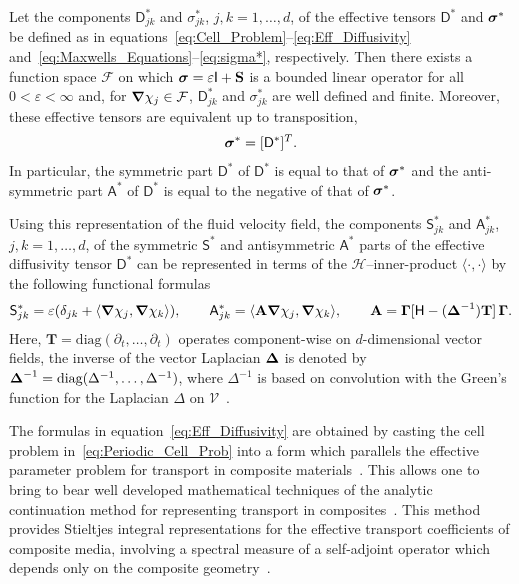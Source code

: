 \documentclass[leqno,onefignum,onetabnum]{siamltex1213}
\newcommand{\Tb}{\mathbf{T}}
\newcommand{\Sb}{\mathbf{S}}
\newcommand{\Ab}{\mathbf{A}}
\newcommand{\bI}{\mathbf{I}}
\newcommand{\Vc}{\mathcal{V}}
\newcommand{\Hc}{\mathcal{H}}
\newcommand{\Fc}{\mathcal{F}}
\newcommand{\Dm}{\mathsf{D}}
\newcommand{\Hm}{\mathsf{H}}
\newcommand{\Sm}{\mathsf{S}}
\newcommand{\Am}{\mathsf{A}}
\newcommand{\Ib}{\mathsf{I}}
\newcommand\bsig{\mbox{\boldmath${\sigma}$}}
\newcommand\bDelta{\mbox{\boldmath${\Delta}$}}
\newcommand\bGamma{\mbox{\boldmath${\Gamma}$}}
\newcommand\bnabla{\mbox{\boldmath${\nabla}$}}
\begin{document}
%
\begin{theorem}\label{thm:kappa_sigma}
%
Let the components $\Dm^*_{jk}$ and $\sigma^*_{jk}$, $j,k=1,\ldots,d$, of the
effective tensors $\Dm^*$ and $\bsig^*$ be defined as in
equations~\eqref{eq:Cell_Problem}--\eqref{eq:Eff_Diffusivity}
and~\eqref{eq:Maxwells_Equations}--\eqref{eq:sigma*},
respectively. Then 
there exists a function space $\Fc$ on which $\bsig=\varepsilon\Ib+\Sb$ is a
bounded linear operator for all $0<\varepsilon<\infty$ and, for $\bnabla \chi_j\in\Fc$,
$\Dm^*_{jk}$ and $\sigma^*_{jk}$ are well defined and finite.
Moreover, these effective tensors are
equivalent up to transposition,  
% 
\begin{align}\label{eq:Eff_Equiv}
  \bsig^*=[\Dm^*]^T.
\end{align}
%
In particular, the symmetric part $\Dm^*$ of $\Dm^*$ is equal to
that of $\bsig^*$ and the anti-symmetric part $\Am^*$ of $\Dm^*$
is equal to the negative of that of $\bsig^*$.
%
\end{theorem}
%

Using
this representation of the fluid velocity field, the components
$\Sm^*_{jk}$ and $\Am^*_{jk}$, $j,k=1,\ldots,d$, of the symmetric $\Sm^*$
and antisymmetric $\Am^*$ parts of the effective diffusivity tensor
$\Dm^*$ can be represented in terms of the $\Hc$--inner-product
$\langle\cdot,\cdot\rangle$ by the following functional
formulas~\cite{Avellaneda:PRL-753,Avellaneda:CMP-339}   
%
\begin{align}\label{eq:Eff_Diffusivity}
 \Sm^*_{jk}=\varepsilon(\delta_{jk}+\langle\bnabla \chi_j,\bnabla \chi_k\rangle), 
  \qquad
 \Am^*_{jk}=\langle\Ab\bnabla \chi_j,\bnabla \chi_k\rangle, 
  \qquad
 \Ab=\bGamma[\Hm-(\bDelta^{-1})\Tb]\,\bGamma.
\end{align}
%
Here, $\Tb=\text{diag}(\partial_t,\ldots,\partial_t)$ operates component-wise on
$d$-dimensional vector fields, the inverse of the vector Laplacian
$\bDelta$ is denoted by $\bDelta^{-1}=\text{diag}(\Delta^{-1},\ldots,\Delta^{-1})$,
where $\Delta^{-1}$ is based on convolution with the
Green's function for the Laplacian $\Delta$ on
$\Vc$~\cite{Stakgold:BVP:2000}.  





The formulas in equation~\eqref{eq:Eff_Diffusivity} are obtained by
casting the cell problem in~\eqref{eq:Periodic_Cell_Prob} into a form
which parallels the effective parameter problem for transport in
composite materials~\cite{Avellaneda:PRL-753,Avellaneda:CMP-339}. This
allows one to bring to bear well developed mathematical techniques of
the analytic continuation method for representing transport in
composites~\cite{Golden:CMP-473,MILTON:2002:TC}. This method provides
Stieltjes integral representations for the effective transport
coefficients of composite media, involving a spectral measure of a
self-adjoint operator which depends only on the composite
geometry~\cite{Golden:CMP-473,Murphy:JMP:063506,MILTON:2002:TC}.
\end{document}
